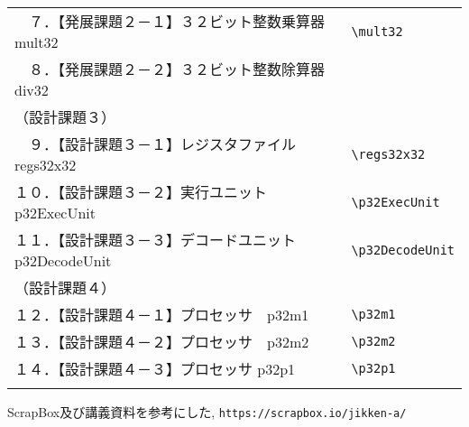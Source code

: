 \documentclass{jarticle}[11pt]
\begin{document}
\begin{table*}[h]
\begin{center}
\begin{tabular}{l|l}
        　７．【発展課題２－１】３２ビット整数乗算器　mult32&
        \verb|\mult32|
        \\
      
        　８．【発展課題２－２】３２ビット整数除算器　div32&
        
        \\
      
        （設計課題３）&
        \\
      
        　９．【設計課題３－１】レジスタファイル　regs32x32&
        \verb|\regs32x32|
        \\ 
      
        １０．【設計課題３－２】実行ユニット　p32ExecUnit&
        \verb|\p32ExecUnit|
        \\ 
      
        １１．【設計課題３－３】デコードユニット p32DecodeUnit&
        \verb|\p32DecodeUnit|
        \\ 
      
        （設計課題４）&
        \\
      
        １２．【設計課題４－１】プロセッサ　p32m1&
        \verb|\p32m1|
        \\ 
      
        １３．【設計課題４－２】プロセッサ　p32m2&
        \verb|\p32m2|
        \\ 
      
        １４．【設計課題４－３】プロセッサ p32p1&
        \verb|\p32p1|
        \\ 
        \\ \hline

      \end{tabular}
    \end{center}
  \end{table*}

  \begin{thebibliography}{99}
     ScrapBox及び講義資料を参考にした, \verb|https://scrapbox.io/jikken-a/|
  \end{thebibliography}
\end{document}
